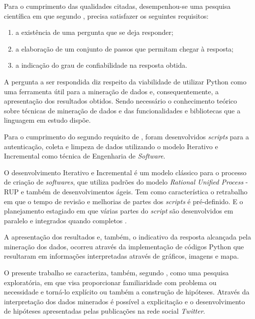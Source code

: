 Para o cumprimento das qualidades citadas, desempenhou-se uma pesquisa científica em que segundo , precisa satisfazer os seguintes requisitos:

\begin{enumerate}
	\item a existência de uma pergunta que se deja responder;
	\item a elaboração de um conjunto de passos que permitam chegar à resposta;
	\item a indicação do grau de confiabilidade na resposta obtida.
\end{enumerate}

A pergunta a ser respondida diz respeito da viabilidade de utilizar Python como uma ferramenta útil para a mineração de dados e, consequentemente, a apresentação dos resultados obtidos. Sendo necessário o conhecimento teórico sobre técnicas de mineração de dados e das funcionalidades e bibliotecas que a linguagem em estudo dispõe.

Para o cumprimento do segundo requisito de , foram desenvolvidos \textit{scripts} para a autenticação, coleta e limpeza de dados utilizando o modelo Iterativo e Incremental como técnica de Engenharia de \textit{Software}.

O desenvolvimento Iterativo e Incremental é um modelo clássico para o processo de criação de \textit{softwares}, que utiliza padrões do modelo \textit{Rational Unified Process} - RUP e também de desenvolvimentos ágeis. Tem como característica o retrabalho em que o tempo de revisão e melhorias de partes dos \textit{scripts} é pré-definido. E o planejamento estagiado em que várias partes do \textit{script} são desenvolvidos em paralelo e integrados quando completos \cite{rup}.

A apresentação dos resultados e, também, o indicativo da resposta alcançada pela mineração dos dados, ocorreu através da implementação de códigos Python que resultaram em informações interpretadas através de gráficos, imagens e mapa.

O presente trabalho se caracteriza, também, segundo , como uma pesquisa exploratória, em que visa proporcionar familiaridade com problema ou necessidade e torná-lo explícito ou também a construção de hipóteses. Através da interpretação dos dados minerados é possível a explicitação e o desenvolvimento de hipóteses apresentadas pelas publicações na rede social \textit{Twitter}.













